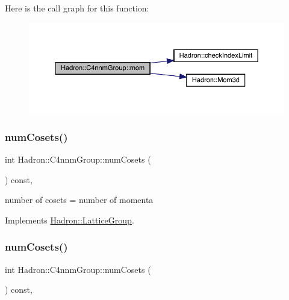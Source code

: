 Here is the call graph for this function\+:
\nopagebreak
\begin{figure}[H]
\begin{center}
\leavevmode
\includegraphics[width=350pt]{d1/dba/structHadron_1_1C4nnmGroup_a7553c7f91a8dc310b37b7b5da32e98f6_cgraph}
\end{center}
\end{figure}
\mbox{\label{structHadron_1_1C4nnmGroup_a38cf4c54a4dff0a3c056aa3a1dc4dca2}} 
\subsubsection{\texorpdfstring{numCosets()}{numCosets()}\hspace{0.1cm}{\footnotesize\ttfamily [1/3]}}
{\footnotesize\ttfamily int Hadron\+::\+C4nnm\+Group\+::num\+Cosets (\begin{DoxyParamCaption}{ }\end{DoxyParamCaption}) const\hspace{0.3cm}{\ttfamily [inline]}, {\ttfamily [virtual]}}

number of cosets = number of momenta 

Implements \mbox{\hyperlink{structHadron_1_1LatticeGroup_afc76430f36a3a041f86d4058c59bf55e}{Hadron\+::\+Lattice\+Group}}.

\mbox{\label{structHadron_1_1C4nnmGroup_a38cf4c54a4dff0a3c056aa3a1dc4dca2}} 
\subsubsection{\texorpdfstring{numCosets()}{numCosets()}\hspace{0.1cm}{\footnotesize\ttfamily [2/3]}}
{\footnotesize\ttfamily int Hadron\+::\+C4nnm\+Group\+::num\+Cosets (\begin{DoxyParamCaption}{ }\end{DoxyParamCaption}) const\hspace{0.3cm}{\ttfamily [inline]}, {\ttfamily [virtual]}}

